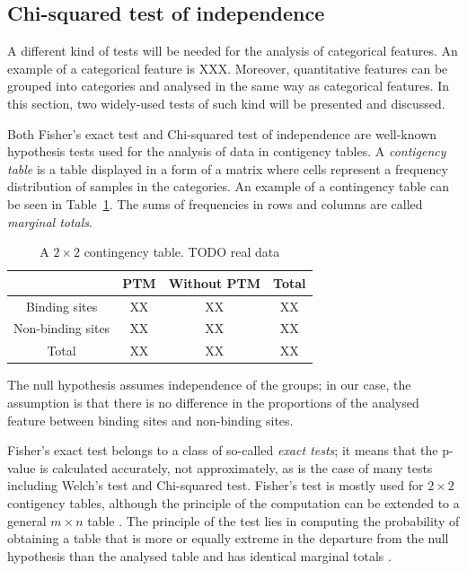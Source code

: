 \subsection{Chi-squared test of independence}

A different kind of tests will be needed for the analysis of categorical features. An example of a categorical feature is XXX. Moreover, quantitative features can be grouped into categories and analysed in the same way as categorical features. In this section, two widely-used tests of such kind will be presented and discussed.

Both Fisher's exact test and Chi-squared test of independence are well-known hypothesis tests used for the analysis of data in contigency tables. A \textit{contigency table} is a table displayed in a form of a matrix where cells represent a frequency distribution of samples in the categories. An example of a contingency table can be seen in Table~\ref{tab:contingency_table_example}. The sums of frequencies in rows and columns are called \textit{marginal totals}.

\begin{table}[!htbp]
\centering
\renewcommand{\arraystretch}{1.5}
 \begin{tabular}{|c|c|c||c|} 
 \hline
  & PTM & Without PTM & Total \\ [0.5ex] 
 \hline
 Binding sites & XX & XX & XX \\ 
 \hline
 Non-binding sites & XX & XX & XX \\
 \hline\hline
 Total & XX & XX & XX \\
 \hline
\end{tabular}
\caption{A $2\times 2$ contingency table. TODO real data}\label{tab:contingency_table_example}
\end{table}

The null hypothesis assumes independence of the groups; in our case, the assumption is that there is no difference in the proportions of the analysed feature between binding sites and non-binding sites.

Fisher's exact test belongs to a class of so-called \textit{exact tests}; it means that the p-value is calculated accurately, not approximately, as is the case of many tests including Welch's test and Chi-squared test. Fisher's test is mostly used for $2\times 2$ contigency tables, although the principle of the computation can be extended to a general $m\times n$ table \cite{Mehta}. The principle of the test lies in computing the probability of obtaining a table that is more or equally extreme in the departure from the null hypothesis than the analysed table and has identical marginal totals \cite{bland}.

